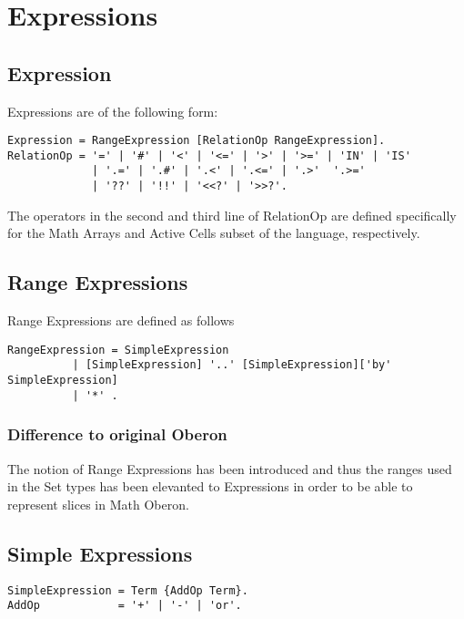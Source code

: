 \documentclass[a4wide,11pt]{article}
\begin{document}
\section{Expressions}

\subsection{Expression}

Expressions are of the following form:
\begin{lstlisting}[style=ebnf]
Expression = RangeExpression [RelationOp RangeExpression].
RelationOp = '=' | '#' | '<' | '<=' | '>' | '>=' | 'IN' | 'IS'
             | '.=' | '.#' | '.<' | '.<=' | '.>'  '.>='
             | '??' | '!!' | '<<?' | '>>?'.
\end{lstlisting}
The operators in the second and third line of RelationOp are defined specifically for the Math Arrays and Active Cells subset of the language, respectively.

\subsection{Range Expressions}
Range Expressions are defined as follows
\begin{lstlisting}[style=ebnf]
RangeExpression = SimpleExpression
          | [SimpleExpression] '..' [SimpleExpression]['by' SimpleExpression]
          | '*' .
\end{lstlisting}

\subsubsection{Difference to original Oberon}
The notion of Range Expressions has been introduced and thus the ranges used in the Set types has been elevanted to Expressions in order to be able to represent slices in Math Oberon.

\subsection{Simple Expressions}

\begin{lstlisting}[style=ebnf]
SimpleExpression = Term {AddOp Term}.
AddOp            = '+' | '-' | 'or'.
\end{lstlisting}
\end{document}
